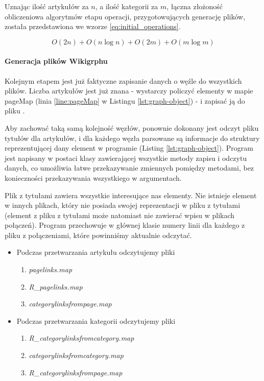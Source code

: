 Uznając ilość artykułów za $n$, a ilość kategorii za $m$, łączna złożoność obliczeniowa algorytmów etapu operacji, przygotowujących generację plików, została przedstawiona we wzorze \ref{eq:initial_operations}.

\begin{equation}
O(2n) + O(n\log n) + O(2m) + O(m \log m)
\label{eq:initial_operations}
\end{equation}

\paragraph{Generacja plików Wikigrphu}
Kolejnym etapem jest już faktyczne zapisanie danych o węźle do wszystkich plików. Liczba artykułów jest już znana - wystarczy policzyć elementy w mapie pageMap (linia \ref{line:pageMap} w Listingu \ref{lst:graph-object}) - i zapisać ją do pliku .

Aby zachować taką samą kolejność węzłów, ponownie dokonany jest odczyt pliku tytułów dla artykułów, i dla każdego węzła parsowane są informacje do struktury reprezentującej dany element w programie (Listing \ref{lst:graph-object}). Program jest napisany w postaci klasy zawierającej wszystkie metody zapisu i odczytu danych, co umożliwia łatwe przekazywanie zmiennych pomiędzy metodami, bez konieczności przekazywania wszystkiego w argumentach.

Plik z tytułami zawiera wszystkie interesujące nas elementy. Nie istnieje element w innych plikach, który nie posiada swojej reprezentacji w pliku z tytułami (element z pliku z tytułami może natomiast nie zawierać wpisu w plikach połączeń). Program przechowuje w głównej klasie numery linii dla każdego z pliku z połączeniami, które powinniśmy aktualnie odczytać.

\begin{itemize}
\item Podczas przetwarzania artykułu odczytujemy pliki
\begin{enumerate}[label=\textbullet]
    \setlength\itemsep{1.1em}
    \item  \textit{pagelinks.map}
    \item  \textit{R\_pagelinks.map}
    \item  \textit{categorylinksfrompage.map}
\end{enumerate}
\item Podczas przetwarzania kategorii odczytujemy pliki
\begin{enumerate}[label=\textbullet]
    \setlength\itemsep{1.1em}
    \item  \textit{R\_categorylinksfromcategory.map}
    \item  \textit{categorylinksfromcategory.map}
    \item  \textit{R\_categorylinksfrompage.map}
\end{enumerate}
\end{itemize}

